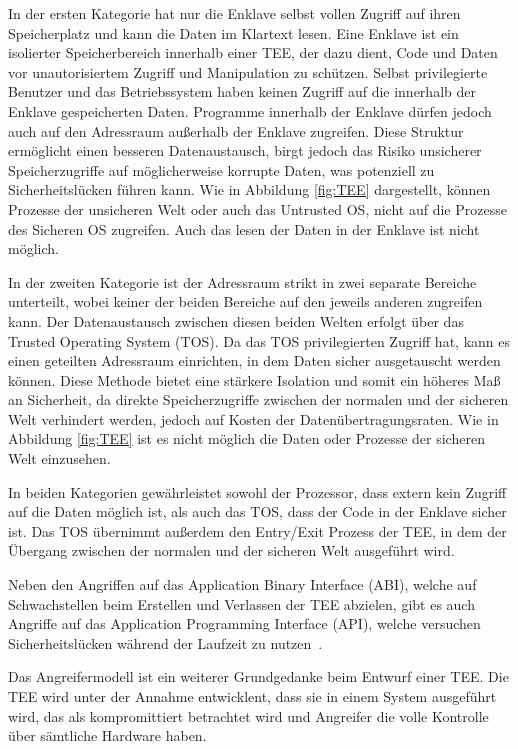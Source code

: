 In der ersten Kategorie hat nur die Enklave selbst vollen Zugriff auf ihren Speicherplatz und kann die Daten im Klartext lesen. 
Eine Enklave ist ein isolierter Speicherbereich innerhalb einer TEE, der dazu dient, Code und Daten vor unautorisiertem Zugriff und Manipulation zu schützen.
Selbst privilegierte Benutzer und das Betriebssystem haben keinen Zugriff auf die innerhalb der Enklave gespeicherten Daten. 
Programme innerhalb der Enklave dürfen jedoch auch auf den Adressraum außerhalb der Enklave zugreifen. 
Diese Struktur ermöglicht einen besseren Datenaustausch, birgt jedoch das Risiko unsicherer Speicherzugriffe auf möglicherweise korrupte Daten, was potenziell zu Sicherheitslücken führen kann. Wie in Abbildung \ref{fig:TEE} dargestellt, können Prozesse der unsicheren Welt oder auch das Untrusted OS, nicht auf die Prozesse des Sicheren OS zugreifen. Auch das lesen der Daten in der Enklave ist nicht möglich.

In der zweiten Kategorie ist der Adressraum strikt in zwei separate Bereiche unterteilt, wobei keiner der beiden Bereiche auf den jeweils anderen zugreifen kann. 
Der Datenaustausch zwischen diesen beiden Welten erfolgt über das Trusted Operating System (TOS). 
Da das TOS privilegierten Zugriff hat, kann es einen geteilten Adressraum einrichten, in dem Daten sicher ausgetauscht werden können. 
Diese Methode bietet eine stärkere Isolation und somit ein höheres Maß an Sicherheit, da direkte Speicherzugriffe zwischen der normalen und der sicheren Welt verhindert werden, jedoch auf Kosten der Datenübertragungsraten. Wie in Abbildung \ref{fig:TEE} ist es nicht möglich die Daten oder Prozesse der sicheren Welt einzusehen.

In beiden Kategorien gewährleistet sowohl der Prozessor, dass extern kein Zugriff auf die Daten möglich ist, als auch das TOS, dass der Code in der Enklave sicher ist. Das TOS übernimmt außerdem den Entry/Exit Prozess der TEE, in dem der Übergang zwischen der normalen und der sicheren Welt ausgeführt wird. 

Neben den Angriffen auf das Application Binary Interface (ABI), welche auf Schwachstellen beim Erstellen und Verlassen der TEE abzielen, gibt es auch Angriffe auf das Application Programming Interface (API), welche versuchen Sicherheitslücken während der Laufzeit zu nutzen~\cite{TEEPaper}.

Das Angreifermodell ist ein weiterer Grundgedanke beim Entwurf einer TEE. Die TEE wird unter der Annahme entwicklent, dass sie in einem System ausgeführt wird, das als kompromittiert betrachtet wird und Angreifer die volle Kontrolle über sämtliche Hardware haben.


